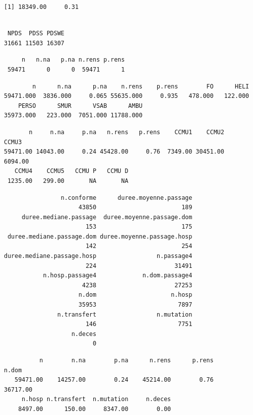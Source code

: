 \documentclass[]{article}
\begin{document}
\begin{verbatim}
[1] 18349.00     0.31
\end{verbatim}

\begin{verbatim}

 NPDS  PDSS PDSWE 
31661 11503 16307 
\end{verbatim}

\begin{verbatim}
     n   n.na   p.na n.rens p.rens 
 59471      0      0  59471      1 
\end{verbatim}

\begin{verbatim}
        n      n.na      p.na    n.rens    p.rens        FO      HELI 
59471.000  3836.000     0.065 55635.000     0.935   478.000   122.000 
    PERSO      SMUR      VSAB      AMBU 
35973.000   223.000  7051.000 11788.000 
\end{verbatim}

\begin{verbatim}
       n     n.na     p.na   n.rens   p.rens    CCMU1    CCMU2    CCMU3 
59471.00 14043.00     0.24 45428.00     0.76  7349.00 30451.00  6094.00 
   CCMU4    CCMU5   CCMU P   CCMU D 
 1235.00   299.00       NA       NA 
\end{verbatim}

\begin{verbatim}
                n.conforme      duree.moyenne.passage 
                     43850                        189 
     duree.mediane.passage  duree.moyenne.passage.dom 
                       153                        175 
 duree.mediane.passage.dom duree.moyenne.passage.hosp 
                       142                        254 
duree.mediane.passage.hosp                 n.passage4 
                       224                      31491 
           n.hosp.passage4             n.dom.passage4 
                      4238                      27253 
                     n.dom                     n.hosp 
                     35953                       7897 
               n.transfert                 n.mutation 
                       146                       7751 
                   n.deces 
                         0 
\end{verbatim}

\begin{verbatim}
          n        n.na        p.na      n.rens      p.rens       n.dom 
   59471.00    14257.00        0.24    45214.00        0.76    36717.00 
     n.hosp n.transfert  n.mutation     n.deces 
    8497.00      150.00     8347.00        0.00 
\end{verbatim}
\end{document}
